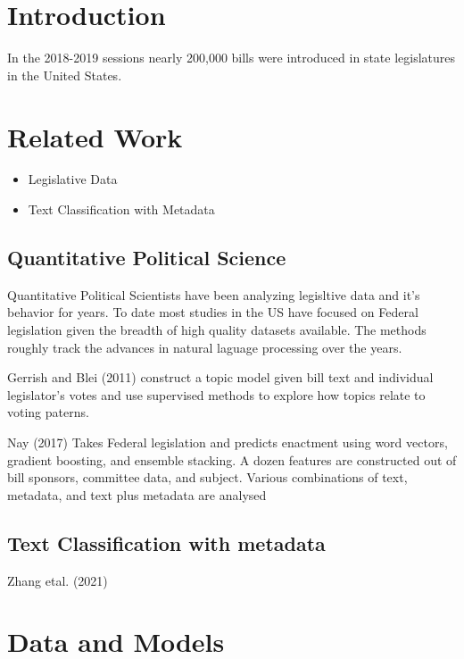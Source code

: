 \documentclass[11pt]{article}
\begin{document}
\section{Introduction}

In the 2018-2019 sessions nearly 200,000 bills were introduced in state legislatures in the United States.

\section{Related Work}

\begin{itemize}
  \item Legislative Data
  \item Text Classification with Metadata
\end{itemize}


\subsection{Quantitative Political Science}

Quantitative Political Scientists have been analyzing legisltive data and it's behavior for years. To date most studies in the US have focused on Federal
legislation given the breadth of high quality datasets available. The methods roughly track the advances in natural laguage processing over the years.

Gerrish and Blei (2011)\cite{gerrish2011predicting} construct a topic model given bill text and individual legislator's votes and use supervised methods to explore how
topics relate to voting paterns.

Nay (2017) \cite{nay2017predicting} Takes Federal legislation and predicts enactment using word vectors, gradient boosting, and ensemble stacking. A dozen features
are constructed out of bill sponsors, committee data, and subject. Various combinations of text, metadata, and text plus metadata are analysed 

\subsection{Text Classification with metadata}

Zhang etal. (2021)\cite{zhang2021match}

\section{Data and Models}
\end{document}
